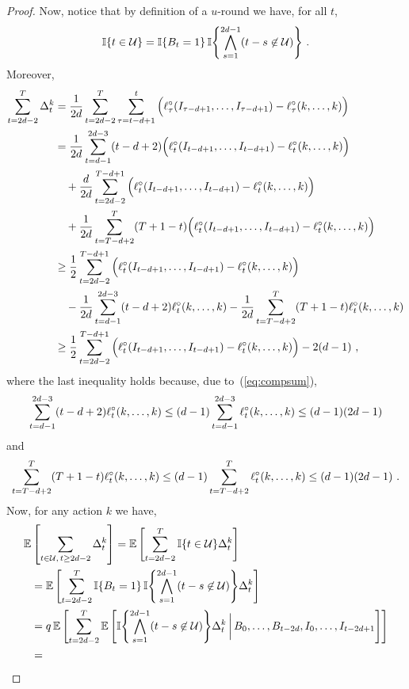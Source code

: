 \begin{proof}
Now, notice that by definition of a $u$-round we have, for all $t$,
\[
\mathbb{I}{\left\{t \in \mathcal{U}\right\}} = \mathbb{I}{\left\{B_t = 1\right\}}\,\mathbb{I}{\left\{\bigwedge_{s=1}^{2d-1}(t-s\not\in \mathcal{U})\right\}}~.
\]
Moreover,
%
\begin{align}
    \sum_{t=2d-2}^T \Delta_t^k
&=
    \frac{1}{2d}\sum_{t=2d-2}^T\sum_{\tau=t-d+1}^t \Big( \ell^{\circ}_\tau(I_{\tau-d+1},\dots,I_{\tau-d+1}) - \ell^{\circ}_\tau(k,\dots,k) \Big)
\nonumber
\\&=
    \frac{1}{2d}\sum_{t=d-1}^{2d-3} (t-d+2)\Big( \ell^{\circ}_t(I_{t-d+1},\dots,I_{t-d+1}) - \ell^{\circ}_t(k,\dots,k) \Big)
\nonumber
\\&
    \quad + \frac{d}{2d}\sum_{t=2d-2}^{T-d+1} \Big( \ell^{\circ}_t(I_{t-d+1},\dots,I_{t-d+1}) - \ell^{\circ}_t(k,\dots,k) \Big)
\nonumber
\\&
    \quad +\frac{1}{2d}\sum_{t=T-d+2}^{T} (T+1-t)\Big( \ell^{\circ}_t(I_{t-d+1},\dots,I_{t-d+1}) - \ell^{\circ}_t(k,\dots,k) \Big)
\nonumber
\\&\geq
    \frac{1}{2}\sum_{t=2d-2}^{T-d+1} \Big( \ell^{\circ}_t(I_{t-d+1},\dots,I_{t-d+1}) - \ell^{\circ}_t(k,\dots,k) \Big)
\nonumber
\\&
    \quad - \frac{1}{2d}\sum_{t=d-1}^{2d-3} (t-d+2)\ell^{\circ}_t(k,\dots,k) - \frac{1}{2d}\sum_{t=T-d+2}^{T} (T+1-t)\ell^{\circ}_t(k,\dots,k)
\nonumber
\\&\ge
    \frac{1}{2}\sum_{t=2d-2}^{T-d+1} \Big( \ell^{\circ}_t(I_{t-d+1},\dots,I_{t-d+1}) - \ell^{\circ}_t(k,\dots,k) \Big) - 2(d-1)~,
\label{e:lowerdelta}
\end{align}
where the last inequality holds because, due to~(\ref{eq:compsum}),
\[
    \sum_{t=d-1}^{2d-3} (t-d+2)\ell^{\circ}_t(k,\dots,k) \le (d-1)\sum_{t=d-1}^{2d-3} \ell^{\circ}_t(k,\dots,k) \le (d-1)(2d-1)
\]
and
\[
    \sum_{t=T-d+2}^{T} (T+1-t)\ell^{\circ}_t(k,\dots,k) \le (d-1)\sum_{t=T-d+2}^{T} \ell^{\circ}_t(k,\dots,k) \le (d-1)(2d-1)~.
\]
Now, for any action $k$ we have,
\begin{align}
    \E&\left[\sum_{t \in \scU,\, t\geq 2d-2} \Delta_t^k \right]
=
    \E\left[\sum_{t=2d-2}^T \Ind{t \in \scU} \Delta_t^k \right]
\nonumber\\ &=
    \E\left[\sum_{t=2d-2}^T \Ind{B_t = 1}\,\Ind{\bigwedge_{s=1}^{2d-1}(t-s \not\in \scU)} \Delta_t^k \right]
\nonumber\\ &=
    q\,\E\left[\sum_{t=2d-2}^T \E\left[\Ind{\bigwedge_{s=1}^{2d-1}(t-s \not\in \scU)}\Delta_t^k \,\bigg|\, B_0,\dots,B_{t-2d},I_0,\ldots,I_{t-2d+1}
    \right]\right]
\nonumber\\ &=

\end{align}
\end{proof}
